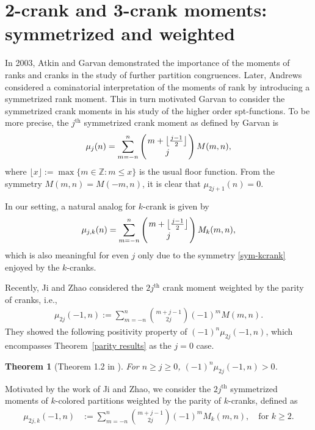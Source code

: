 \documentclass[12pt]{amsart}
\numberwithin{equation}{section}
\theoremstyle{plain}
\newtheorem{theorem}{Theorem}[section]
\theoremstyle{definition}
\begin{document}
\section{2-crank and 3-crank moments: symmetrized and weighted}\label{sec:3}
In 2003, Atkin and Garvan \cite{AG} demonstrated the importance of the moments of ranks and cranks in the study of further partition congruences. Later, Andrews \cite{Andr3} considered a cominatorial interpretation of the moments of rank by introducing a symmetrized rank moment. This in turn motivated Garvan \cite{Gar2} to consider the symmetrized crank moments in his study of the higher order spt-functions. To be more precise, the $j^{\text{th}}$ symmetrized crank moment as defined by Garvan \cite{Gar2} is
\begin{align*}
\mu_{j}(n)=\sum_{m=-n}^{n}\left(m+\left\lfloor\frac{j-1}{2}\right\rfloor\atop j\right)M(m,n),
\end{align*}
where $\lfloor x \rfloor:=\max\{m\in\mathbb{Z}: m\leq x\}$ is the usual floor function. From the symmetry $M(m,n)=M(-m,n)$, it is clear that $\mu_{2j+1}(n)=0$.

In our setting, a natural analog for $k$-crank is given by
\begin{align*}
\mu_{j,k}(n)=\sum_{m=-n}^{n}\left(m+\left\lfloor\frac{j-1}{2}\right\rfloor\atop j\right)M_{k}(m,n),
\end{align*}
which is also meaningful for even $j$ only due to the symmetry \eqref{sym-kcrank} enjoyed by the $k$-cranks.

Recently, Ji and Zhao \cite{JZ} considered the $2j^{\text{th}}$ crank moment weighted by the parity of cranks, i.e.,
\begin{align*}
\mu_{2j}(-1,n):=\sum_{m=-n}^{n}\binom{m+j-1}{2j}(-1)^{m}M(m,n).
\end{align*}
They showed the following positivity property of $(-1)^{n}\mu_{2j}(-1,n)$, which encompasses Theorem~\ref{parity results} as the $j=0$ case.
\begin{theorem}[Theorem 1.2 in \cite{JZ}]\label{thm:J-Z}
For $n\geq j\geq0$, $(-1)^{n}\mu_{2j}(-1,n)>0$.
\end{theorem}

Motivated by the work of Ji and Zhao, we consider the $2j^{\text{th}}$ symmetrized moments of $k$-colored partitions weighted by the parity of $k$-cranks, defined as
\begin{align}
\mu_{2j,k}(-1,n) &:=\sum_{m=-n}^{n}\binom{m+j-1}{2j}(-1)^{m}M_{k}(m,n), \quad \textrm{for } k\geq 2.\label{mu2jk-1}
\end{align}
\end{document}
